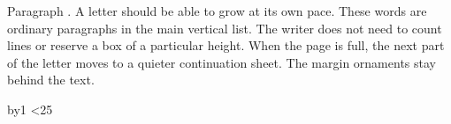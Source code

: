 \documentclass[a4paper]{seasonalletter}
\begin{document}
\begin{SeasonalLetter}[season=summer,weekday=sunday]
\newcount\paragraphnumber
{}
\loop
Paragraph \the\paragraphnumber. A letter should be able to grow at its own pace.
These words are ordinary paragraphs in the main vertical list. The writer does
not need to count lines or reserve a box of a particular height. When the page
is full, the next part of the letter moves to a quieter continuation sheet.
The margin ornaments stay behind the text.\par
\advance\paragraphnumber by1
\ifnum\paragraphnumber<25\repeat
{}
\end{SeasonalLetter}
\end{document}
